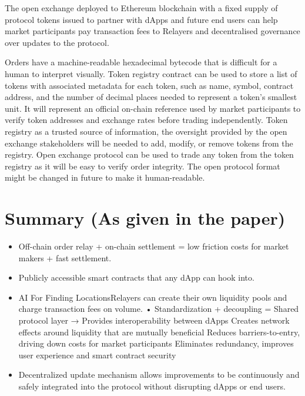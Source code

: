 \documentclass{article}
\begin{document}
The open exchange deployed to Ethereum blockchain with a fixed supply of protocol tokens issued to partner with dApps and future end users can help market participants pay transaction fees to Relayers and decentralised governance over updates to the protocol. 

Orders have a machine-readable hexadecimal bytecode that is difficult for a human to interpret visually. Token registry contract can be used to store a list of tokens with associated metadata for each token, such as name, symbol, contract address, and the number of decimal places needed to represent a token’s smallest unit. It will represent an official on-chain reference used by market participants to verify token addresses and exchange rates before trading independently. Token registry as a trusted source of information, the oversight provided by the open exchange stakeholders will be needed to add, modify, or remove tokens from the registry. Open exchange protocol can be used to trade any token from the token registry as it will be easy to verify order integrity. The open protocol format might be changed in future to make it human-readable.  

\section{Summary (As given in the paper)}
\begin{itemize}
	\item Off-chain order relay + on-chain settlement = low friction costs for market makers + fast settlement. 
  
	\item Publicly accessible smart contracts that any dApp can hook into.
  
	\item AI For Finding LocationsRelayers can create their own liquidity pools and charge transaction fees on volume. • Standardization + decoupling = Shared protocol layer → 
  \subitem Provides interoperability between dApps 
  \subitem Creates network effects around liquidity that are mutually beneficial 
  \subitem Reduces barriers-to-entry, driving down costs for market participants 
  \subitem Eliminates redundancy, improves user experience and smart contract security

	\item Decentralized update mechanism allows improvements to be continuously and safely integrated into the protocol without disrupting dApps or end users.

\end{itemize}
\end{document}
